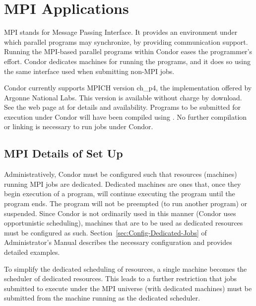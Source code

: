 \section{\label{sec:MPI}MPI Applications}
MPI stands for Message Passing Interface.
It provides an environment under which parallel programs
may synchronize, 
by providing communication support.
Running the MPI-based parallel programs within Condor 
eases the programmer's effort.
Condor dedicates machines for running the programs,
and it does so using the same interface used when submitting
non-MPI jobs.

Condor currently supports MPICH version ch\_p4, the implementation
offered by Argonne National Labs.
This version is available without charge by download.
See the web page at
for details and availability.
Programs to be submitted for execution under Condor will have
been compiled using .
No further compilation or linking is necessary to run jobs
under Condor.

\subsection{\label{sec:MPI-setup}MPI Details of Set Up}

Administratively, Condor must be configured such that resources
(machines) running MPI jobs are dedicated.
Dedicated machines are ones that, once they begin execution of
a program, will continue executing the program until
the program ends.
The program will not be preempted (to run another program) or
suspended.
Since Condor is not ordinarily used in this manner (Condor uses
opportunistic scheduling),
machines that are to be used as dedicated resources
must be configured as such.
Section~\ref{sec:Config-Dedicated-Jobs} of
Administrator's Manual describes the necessary
configuration and provides detailed examples.

To simplify the dedicated scheduling of resources,
a single machine becomes the scheduler of dedicated resources.
This leads to a further restriction that jobs submitted
to execute under the MPI universe (with dedicated machines)
must be
submitted from the machine running as the dedicated scheduler.

